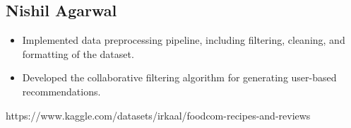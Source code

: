 \documentclass[conference]{IEEEtran}
\begin{document}
\subsection{Nishil Agarwal}
\begin{itemize}
    \item Implemented data preprocessing pipeline, including filtering, cleaning, and formatting of the dataset.
    \item Developed the collaborative filtering algorithm for generating user-based recommendations.
\end{itemize}

\begin{thebibliography}{99}
https://www.kaggle.com/datasets/irkaal/foodcom-recipes-and-reviews

\end{thebibliography}
\end{document}

